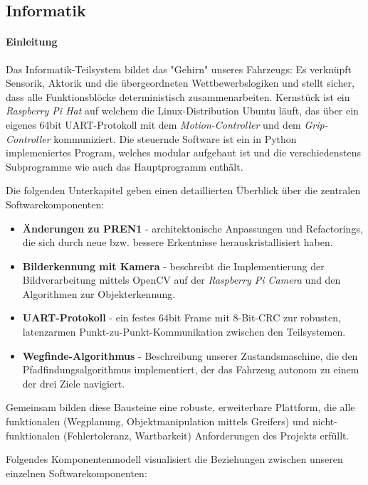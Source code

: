 \documentclass[main.tex]{subfiles} %
\begin{document}
\subsection{Informatik}

\paragraph{Einleitung}

Das Informatik-Teilsystem bildet das "Gehirn" unseres Fahrzeugs:
Es verknüpft Sensorik, Aktorik und die übergeordneten
Wettbewerbslogiken und stellt sicher, dass alle Funktionsblöcke
deterministisch zusammenarbeiten.
Kernstück ist ein \emph{Raspberry Pi Hat} auf welchem die
Linux-Distribution Ubuntu läuft, das über ein
eigenes 64bit UART-Protokoll mit dem \emph{Motion-Controller}
und dem \emph{Grip-Controller} kommuniziert.
Die steuernde Software ist ein in Python implemeniertes Program, welches modular
aufgebaut ist und die verschiedenstens Subprogramme wie auch das
Hauptprogramm enthält.

Die folgenden Unterkapitel geben einen detaillierten Überblick über
die zentralen Softwarekomponenten:

\begin{itemize}\setlength\itemsep{0.3em}
  \item \textbf{Änderungen zu PREN1} - architektonische Anpassungen
    und Refactorings, die sich durch neue bzw. bessere Erkentnisse
    herauskristallisiert haben.
  \item \textbf{Bilderkennung mit Kamera} - beschreibt die Implementierung
    der Bildverarbeitung mittels OpenCV auf der \emph{Raspberry Pi
    Camera} und den Algorithmen zur Objekterkennung.
  \item \textbf{UART-Protokoll} - ein festes 64bit Frame mit
    8-Bit-CRC zur robusten, latenzarmen Punkt-zu-Punkt-Kommunikation
    zwischen den Teilsystemen.
  \item \textbf{Wegfinde-Algorithmus} - Beschreibung unserer
    Zustandsmaschine, die den Pfadfindungsalgorithmus implementiert,
    der das Fahrzeug autonom zu einem der drei Ziele navigiert.
\end{itemize}

Gemeinsam bilden diese Bausteine eine robuste, erweiterbare
Plattform, die alle funktionalen (Wegplanung, Objektmanipulation
mittels Greifers) und
nicht-funktionalen (Fehlertoleranz, Wartbarkeit)
Anforderungen des Projekts erfüllt.

Folgendes Komponentenmodell visualisiert die Beziehungen
zwischen unseren einzelnen Softwarekomponenten:
\end{document}
